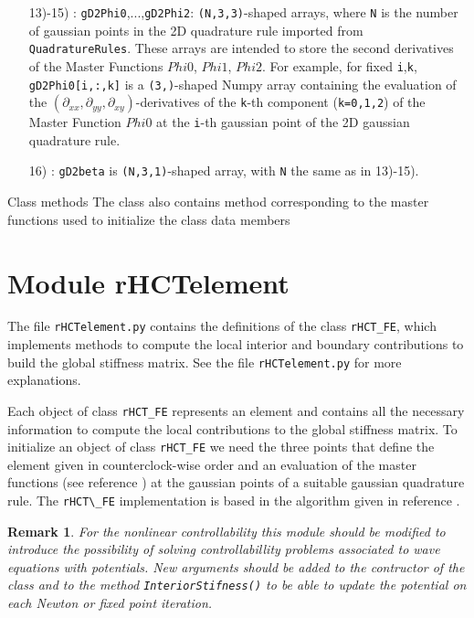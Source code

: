 \documentclass{amsart}
\theoremstyle{plain}
\newtheorem{remark}{Remark}
\theoremstyle{definition}
\theoremstyle{remark}
\numberwithin{equation}{section}
\begin{document}
\begin{itemize}
\item[13)-15)]: \verb|gD2Phi0|,...,\verb|gD2Phi2|: \verb|(N,3,3)|-shaped arrays, where \verb|N| is
the number of gaussian points in the 2D quadrature rule imported from \verb|QuadratureRules|. These arrays are intended to store the second derivatives of the Master Functions $Phi0$, $Phi1$, $Phi2$.
For example, for fixed \verb|i|,\verb|k|,  \verb|gD2Phi0[i,:,k]| is a \verb|(3,)|-shaped Numpy array containing the evaluation of the $(\partial_{xx},\partial_{yy},\partial_{xy})$-derivatives of the \verb|k|-th component (\verb|k=0,1,2|) of the Master Function $Phi0$ at the \verb|i|-th gaussian point of the 2D gaussian quadrature rule.
\item[16)]: \verb|gD2beta|  is \verb|(N,3,1)|-shaped array, with \verb|N| the same as in 13)-15). 

\end{itemize}




 Class methods
The class also contains method corresponding to the master functions  used
to initialize the class data members

\section{Module rHCTelement} 

The file \verb|rHCTelement.py| contains the definitions of the class \verb|rHCT_FE|, which implements
methods to compute the local interior and boundary contributions to build the global
stiffness matrix. See the file \verb|rHCTelement.py| for more explanations.

Each object of class \verb|rHCT_FE| represents an element and contains all the necessary
information to compute the local contributions to the global stiffness matrix. 
To initialize an object of class \verb|rHCT_FE| we need the three points that define the element
given in counterclock-wise order and an evaluation of the master functions
(see reference \cite{Meyer}) at the gaussian points of a suitable gaussian quadrature rule.
The \verb|rHCT\_FE| implementation is based in the algorithm given in reference \cite{Meyer}.

\begin{remark}
For the nonlinear controllability this module should be modified to introduce the
possibility of solving controllabillity problems associated to wave equations with
potentials. New arguments should be added to the contructor of the class and to the
method \verb|InteriorStifness()| to be able to update the potential on each Newton or fixed
point iteration.
\end{remark}
\end{document}
